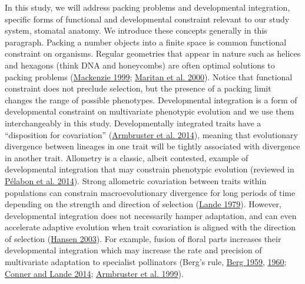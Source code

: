 \documentclass[
  12pt,
]{article}
\begin{document}
In this study, we will address packing problems and developmental integration, specific forms of functional and developmental constraint relevant to our study system, stomatal anatomy. We introduce these concepts generally in this paragraph. Packing a number objects into a finite space is common functional constraint on organisms. Regular geometries that appear in nature such as helices and hexagons (think DNA and honeycombs) are often optimal solutions to packing problems (\protect\hyperlink{ref-mackenzie_proving_1999}{Mackenzie 1999}; \protect\hyperlink{ref-maritan_optimal_2000}{Maritan et al. 2000}). Notice that functional constraint does not preclude selection, but the presence of a packing limit changes the range of possible phenotypes. Developmental integration is a form of developmental constraint on multivariate phenotypic evolution and we use them interchangeably in this study. Developmentally integrated traits have a ``disposition for covariation'' (\protect\hyperlink{ref-armbruster_integrated_2014}{Armbruster et al. 2014}), meaning that evolutionary divergence between lineages in one trait will be tightly associated with divergence in another trait. Allometry is a classic, albeit contested, example of developmental integration that may constrain phenotypic evolution (reviewed in \protect\hyperlink{ref-pelabon_evolution_2014}{Pélabon et al. 2014}). Strong allometric covariation between traits within populations can constrain macroevolutionary divergence for long periods of time depending on the strength and direction of selection (\protect\hyperlink{ref-lande_quantitative_1979}{Lande 1979}). However, developmental integration does not necessarily hamper adaptation, and can even accelerate adaptive evolution when trait covariation is aligned with the direction of selection (\protect\hyperlink{ref-hansen_is_2003}{Hansen 2003}). For example, fusion of floral parts increases their developmental integration which may increase the rate and precision of multivariate adaptation to specialist pollinators (Berg's rule, \protect\hyperlink{ref-berg_general_1959}{Berg 1959}, \protect\hyperlink{ref-berg_ecological_1960}{1960}; \protect\hyperlink{ref-conner_raissa_2014}{Conner and Lande 2014}; \protect\hyperlink{ref-armbruster_covariance_1999}{Armbruster et al. 1999}).
\end{document}
